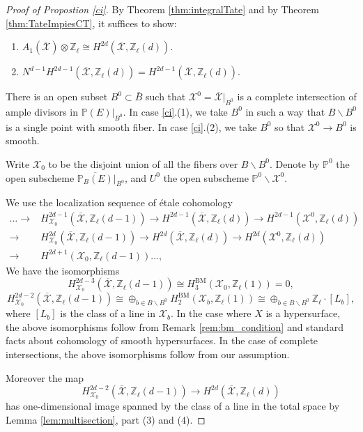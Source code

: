 \documentclass{amsart}
\theoremstyle{definition}
\theoremstyle{remark}
\newcommand{\mbb}{\mathbb}
\newcommand{\ZZ}{\mbb{Z}}
\newcommand{\PP}{\mbb{P}}
\newcommand{\mc}{\mathcal}
\newcommand{\mcX}{\mc{X}}
\begin{document}
\begin{proof}[Proof of Propostion \ref{ci}]By Theorem \ref{thm:integralTate} and  by Theorem \ref{thm:TateImpiesCT},
it suffices to show:
\begin{enumerate}
    \item $A_1(\overline{\mcX})\otimes \ZZ_\ell \cong H^{2d}(\overline{\mcX}, \ZZ_\ell(d)).$
    \item $N^{d-1}H^{2d-1}(\overline{\mcX}, \ZZ_\ell(d))  
=H^{2d-1}(\overline{\mcX}, \ZZ_\ell(d)).$
\end{enumerate}
There is an open subset $B^0 \subset \bar{B}$ such that $\mcX^0=\overline{\mcX}|_{B^0}$ is a complete intersection of ample divisors in $\PP(E)|_{B^0}$.
In case \ref{ci}.(1), we take $B^0$ in such a way that $B\backslash B^0$ is a single point with smooth fiber.
In case \ref{ci}.(2), we take $B^0$ so that ${\mcX}^0 \to B^0$ is smooth.


Write $\mcX_0$ to be the disjoint union of all the fibers over $B\backslash B^0$.
Denote by $\PP^0$ the open subscheme $\overline{\PP_B(E)}|_{B^0}$, and $U^0$ the open subscheme $\PP^0\backslash \mcX^0$.


We use the localization sequence of \'etale cohomology
\begin{align*}
   \ldots \to &H^{2d-1}_{\mcX_0}(\overline{\mcX}, \ZZ_\ell(d-1)) \to H^{2d-1}(\overline{\mcX}, \ZZ_\ell(d)) \to H^{2d-1}({\mcX}^0, \ZZ_\ell(d)) \\
    \to&H^{2d}_{\mcX_0}(\overline{\mcX}, \ZZ_\ell(d-1)) \to H^{2d}(\overline{\mcX}, \ZZ_\ell(d)) \to H^{2d}({\mcX}^0, \ZZ_\ell(d))\\ \to &H^{2d+1}(\mcX_0, \ZZ_\ell(d-1))\ldots,
\end{align*}
We have the isomorphisms \[
H^{2d-3}_{\mcX_0}(\overline{\mcX}, \ZZ_\ell(d-1))\cong H^\text{BM}_3(\mcX_0, \ZZ_\ell(1))=0,\]
\[
H^{2d-2}_{\mcX_0}(\overline{\mcX}, \ZZ_\ell(d-1))\cong \oplus_{b \in B\backslash B^0} H^{\text{BM}}_2(\mcX_b, \ZZ_\ell(1)) \cong \oplus_{b \in B\backslash B^0} \ZZ_\ell\cdot [L_b],\]
where $[L_b]$ is the class of a line in $\mcX_b$.
In the case where $X$ is a hypersurface,
the above isomorphisms follow from Remark \ref{rem:bm_condition} and standard facts about cohomology of smooth hypersurfaces.
In the case of complete intersections, the above isomorphisms follow from our assumption.

Moreover the map
\[
H^{2d-2}_{\mcX_0}(\overline{\mcX}, \ZZ_\ell(d-1)) \to H^{2d}(\overline{\mcX}, \ZZ_\ell(d))
\]
has one-dimensional image spanned by the class of a line in the total space by Lemma \ref{lem:multisection}, part (3) and (4).





\end{proof}
\end{document}
